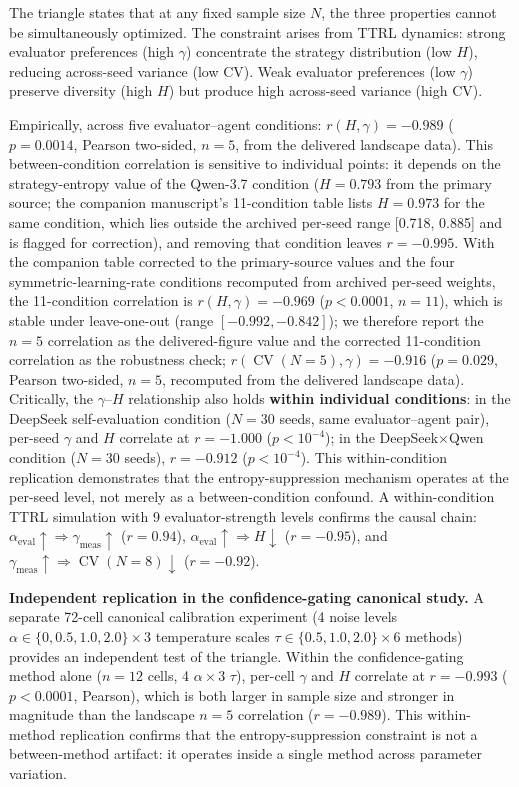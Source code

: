 \documentclass[11pt]{article}
\DeclareMathOperator{\CV}{CV}
\begin{document}
The triangle states that at any fixed sample size $N$, the three properties cannot be simultaneously optimized. The constraint arises from TTRL dynamics: strong evaluator preferences (high $\gamma$) concentrate the strategy distribution (low $H$), reducing across-seed variance (low CV). Weak evaluator preferences (low $\gamma$) preserve diversity (high $H$) but produce high across-seed variance (high CV).

Empirically, across five evaluator--agent conditions: $r(H, \gamma) = -0.989$ ($p = 0.0014$, Pearson two-sided, $n{=}5$, from the delivered landscape data). This between-condition correlation is sensitive to individual points: it depends on the strategy-entropy value of the Qwen-3.7 condition ($H{=}0.793$ from the primary source; the companion manuscript's 11-condition table lists $H{=}0.973$ for the same condition, which lies outside the archived per-seed range [0.718, 0.885] and is flagged for correction), and removing that condition leaves $r = -0.995$. With the companion table corrected to the primary-source values and the four symmetric-learning-rate conditions recomputed from archived per-seed weights, the 11-condition correlation is $r(H, \gamma) = -0.969$ ($p < 0.0001$, $n{=}11$), which is stable under leave-one-out (range $[-0.992, -0.842]$); we therefore report the $n{=}5$ correlation as the delivered-figure value and the corrected 11-condition correlation as the robustness check; $r(\CV(N{=}5), \gamma) = -0.916$ ($p = 0.029$, Pearson two-sided, $n{=}5$, recomputed from the delivered landscape data). Critically, the $\gamma$--$H$ relationship also holds \textbf{within individual conditions}: in the DeepSeek self-evaluation condition ($N{=}30$ seeds, same evaluator--agent pair), per-seed $\gamma$ and $H$ correlate at $r = -1.000$ ($p < 10^{-4}$); in the DeepSeek$\times$Qwen condition ($N{=}30$ seeds), $r = -0.912$ ($p < 10^{-4}$). This within-condition replication demonstrates that the entropy-suppression mechanism operates at the per-seed level, not merely as a between-condition confound. A within-condition TTRL simulation with 9 evaluator-strength levels confirms the causal chain: $\alpha_{\text{eval}} \uparrow \Rightarrow \gamma_{\text{meas}} \uparrow$ ($r = 0.94$), $\alpha_{\text{eval}} \uparrow \Rightarrow H \downarrow$ ($r = -0.95$), and $\gamma_{\text{meas}} \uparrow \Rightarrow \CV(N{=}8) \downarrow$ ($r = -0.92$).

\textbf{Independent replication in the confidence-gating canonical study.} A separate 72-cell canonical calibration experiment (4 noise levels $\alpha \in \{0, 0.5, 1.0, 2.0\} \times 3$ temperature scales $\tau \in \{0.5, 1.0, 2.0\} \times 6$ methods) provides an independent test of the triangle. Within the confidence-gating method alone ($n{=}12$ cells, 4 $\alpha \times 3$ $\tau$), per-cell $\gamma$ and $H$ correlate at $r = -0.993$ ($p < 0.0001$, Pearson), which is both larger in sample size and stronger in magnitude than the landscape $n{=}5$ correlation ($r = -0.989$). This within-method replication confirms that the entropy-suppression constraint is not a between-method artifact: it operates inside a single method across parameter variation.
\end{document}
